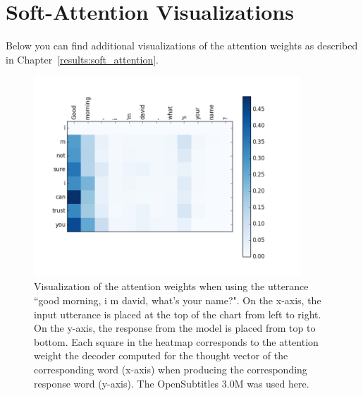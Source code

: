\chapter{Soft-Attention Visualizations}
\label{appendix:soft_attention}

Below you can find additional visualizations of the attention weights as described in Chapter~\ref{results:soft_attention}.

\begin{figure}[H]
	\centering
	\includegraphics[width=10cm]{img/attention/attention_visualization1_OpenSubtitle-3M.png}
	\caption{Visualization of the attention weights when using the utterance ``good morning, i m david, what's your name?". On the x-axis, the input utterance is placed at the top of the chart from left to right. On the y-axis, the response from the model is placed from top to bottom. Each square in the heatmap corresponds to the attention weight the decoder computed for the thought vector of the corresponding word (x-axis) when producing the corresponding response word (y-axis). The OpenSubtitles 3.0M was used here.}
	\label{results:attention:example1:opensubtitles-3M}
\end{figure}

